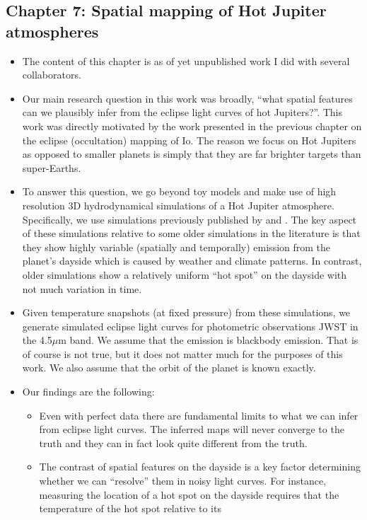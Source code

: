 \documentclass[12pt,dvipsnames]{report}
\begin{document}
\subsection{Chapter 7: Spatial mapping of Hot Jupiter atmospheres}
\begin{itemize}
\item The content of this chapter is as of yet unpublished work I did with several 
collaborators.
\item Our main research question in this work was broadly, ``what spatial features can 
we plausibly infer from the eclipse light curves of hot Jupiters?''. This work was directly
motivated by the work presented in the previous chapter on the eclipse (occultation) mapping of Io.
The reason we focus on Hot Jupiters as opposed to smaller planets is simply that they are far brighter targets than 
super-Earths. 
\item To answer this question, we go beyond toy models and make use of high resolution 
3D hydrodynamical simulations of a Hot Jupiter atmosphere. Specifically, we use simulations 
previously published by  \citet{2021ApJ...913L..32C} and \citet{2022MNRAS.511.3584S}.
The key aspect of these simulations relative to some older simulations in the literature is 
that they show highly variable (spatially and temporally) emission from the planet's dayside
which is caused by weather and climate patterns. In contrast, older simulations show 
a relatively uniform ``hot spot'' on the dayside with not much variation in time.
\item Given temperature snapshots (at fixed pressure) from these simulations, we generate 
simulated eclipse light curves for photometric observations JWST in the 4.5$\mu$m band.
We assume that the emission is blackbody emission. That is of course is not true, but it does 
not matter much for the purposes of this work. We also assume that the orbit of the planet 
is known exactly. 
\item Our findings are the following:
\begin{itemize}
    \item Even with perfect data there are fundamental limits to what we can infer from
    eclipse light curves. The inferred maps will never converge to the truth and they 
    can in fact look quite different from the truth. 
    \item The contrast of spatial features on the dayside is a key factor determining whether 
    we can ``resolve'' them in noisy light curves. For instance, measuring the location
    of a hot spot on the dayside requires that the temperature of the hot spot relative to its

\end{itemize}
\end{itemize}
\end{document}
